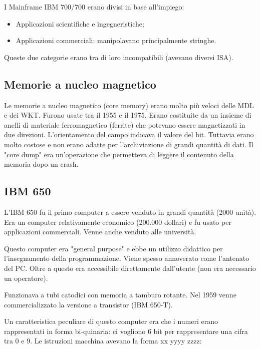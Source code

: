 
I Mainframe IBM 700/700 erano divisi in base all'impiego:

\begin{itemize}
    \item Applicazioni scientifiche e ingegneristiche;
    \item Applicazioni commerciali: manipolavano principalmente stringhe.
\end{itemize}

Queste due categorie erano tra di loro incompatibili (avevano diversi ISA).

\subsection{Memorie a nucleo magnetico}

Le memorie a nucleo magnetico (core memory) erano molto più veloci delle MDL e dei WKT.
Furono usate tra il 1955 e il 1975. Erano costituite da un insieme di anelli di materiale
ferromagnetico (ferrite) che potevano essere magnetizzati in due direzioni. L'orientamento
del campo indicava il valore del bit. Tuttavia erano molto costose e non erano adatte per
l'archiviazione di grandi quantità di dati.
Il "core dump" era un'operazione che permetteva di leggere il contenuto della memoria dopo
un crash.

\subsection{IBM 650}

L'IBM 650 fu il primo computer a essere venduto in grandi quantità (2000 unità). Era un
computer relativamente economico (200.000 dollari) e fu usato per applicazioni commerciali.
Venne anche venduto alle università.

Questo computer era "general purpose" e ebbe un utilizzo didattico per l'insegnamento
della programmazione. Viene spesso annoverato come l'antenato del PC. Oltre a questo era
accessibile direttamente dall'utente (non era necessario un operatore).

Funzionava a tubi catodici con memoria a tamburo rotante. Nel 1959 venne commercializzato
la versione a transistor (IBM 650-T).

Un caratteristica peculiare di questo computer era che i numeri erano rappresentati in 
forma bi-quinaria: ci vogliono 6 bit per rappresentare una cifra tra 0 e 9. Le istruzioni macchina
avevano la forma xx yyyy zzzz:

